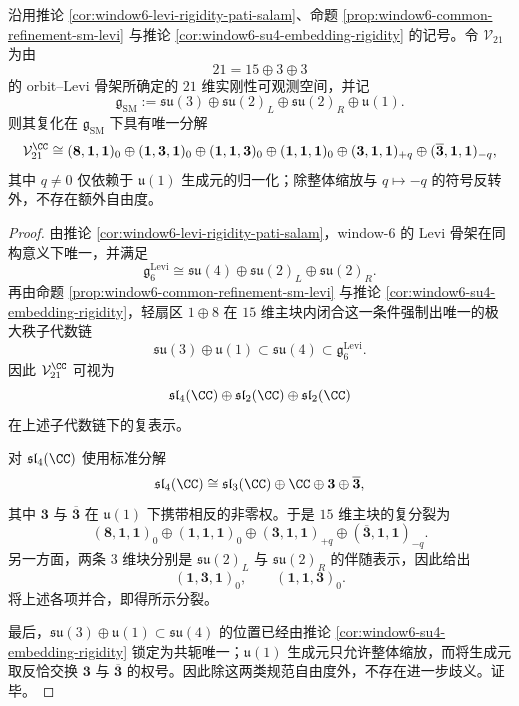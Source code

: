 \begin{theorem}\label{thm:window6-rigid-observable-unique-complex-splitting}
沿用推论 \ref{cor:window6-levi-rigidity-pati-salam}、命题 \ref{prop:window6-common-refinement-sm-levi} 与推论 \ref{cor:window6-su4-embedding-rigidity} 的记号。令 \(\mathcal V_{21}\) 为由
\[
21=15\oplus 3\oplus 3
\]
的 orbit--Levi 骨架所确定的 \(21\) 维实刚性可观测空间，并记
\[
\mathfrak g_{\mathrm{SM}}
:=
\mathfrak{su}(3)\oplus \mathfrak{su}(2)_L\oplus \mathfrak{su}(2)_R\oplus \mathfrak u(1).
\]
则其复化在 \(\mathfrak g_{\mathrm{SM}}\) 下具有唯一分解
\[
\mathcal V_{21}^{\CC}
\cong
(\mathbf 8,\mathbf 1,\mathbf 1)_0
\oplus
(\mathbf 1,\mathbf 3,\mathbf 1)_0
\oplus
(\mathbf 1,\mathbf 1,\mathbf 3)_0
\oplus
(\mathbf 1,\mathbf 1,\mathbf 1)_0
\oplus
(\mathbf 3,\mathbf 1,\mathbf 1)_{+q}
\oplus
(\overline{\mathbf 3},\mathbf 1,\mathbf 1)_{-q},
\]
其中 \(q\neq 0\) 仅依赖于 \(\mathfrak u(1)\) 生成元的归一化；除整体缩放与 \(q\mapsto -q\) 的符号反转外，不存在额外自由度。
\end{theorem}
\begin{proof}
由推论 \ref{cor:window6-levi-rigidity-pati-salam}，window-\(6\) 的 Levi 骨架在同构意义下唯一，并满足
\[
\mathfrak g_6^{\mathrm{Levi}}
\cong
\mathfrak{su}(4)\oplus \mathfrak{su}(2)_L\oplus \mathfrak{su}(2)_R.
\]
再由命题 \ref{prop:window6-common-refinement-sm-levi} 与推论 \ref{cor:window6-su4-embedding-rigidity}，轻扇区 \(1\oplus 8\) 在 \(15\) 维主块内闭合这一条件强制出唯一的极大秩子代数链
\[
\mathfrak{su}(3)\oplus \mathfrak u(1)\subset \mathfrak{su}(4)\subset \mathfrak g_6^{\mathrm{Levi}}.
\]
因此 \(\mathcal V_{21}^{\CC}\) 可视为
\[
\mathfrak{sl}_4(\CC)\oplus \mathfrak{sl}_2(\CC)\oplus \mathfrak{sl}_2(\CC)
\]
在上述子代数链下的复表示。

对 \(\mathfrak{sl}_4(\CC)\) 使用标准分解
\[
\mathfrak{sl}_4(\CC)
\cong
\mathfrak{sl}_3(\CC)\oplus \CC\oplus \mathbf 3\oplus \overline{\mathbf 3},
\]
其中 \(\mathbf 3\) 与 \(\overline{\mathbf 3}\) 在 \(\mathfrak u(1)\) 下携带相反的非零权。于是 \(15\) 维主块的复分裂为
\[
(\mathbf 8,\mathbf 1,\mathbf 1)_0
\oplus
(\mathbf 1,\mathbf 1,\mathbf 1)_0
\oplus
(\mathbf 3,\mathbf 1,\mathbf 1)_{+q}
\oplus
(\overline{\mathbf 3},\mathbf 1,\mathbf 1)_{-q}.
\]
另一方面，两条 \(3\) 维块分别是 \(\mathfrak{su}(2)_L\) 与 \(\mathfrak{su}(2)_R\) 的伴随表示，因此给出
\[
(\mathbf 1,\mathbf 3,\mathbf 1)_0,
\qquad
(\mathbf 1,\mathbf 1,\mathbf 3)_0.
\]
将上述各项并合，即得所示分裂。

最后，\(\mathfrak{su}(3)\oplus \mathfrak u(1)\subset \mathfrak{su}(4)\) 的位置已经由推论 \ref{cor:window6-su4-embedding-rigidity} 锁定为共轭唯一；\(\mathfrak u(1)\) 生成元只允许整体缩放，而将生成元取反恰交换 \(\mathbf 3\) 与 \(\overline{\mathbf 3}\) 的权号。因此除这两类规范自由度外，不存在进一步歧义。证毕。
\end{proof}

